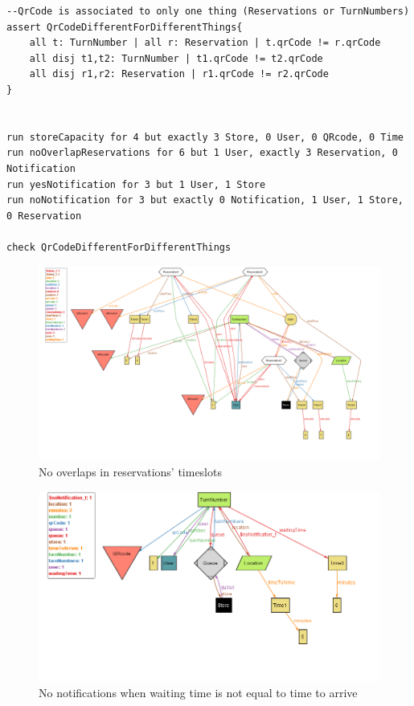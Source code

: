 \documentclass{article}
\begin{document}
\begin{lstlisting}[language=alloy]
--QrCode is associated to only one thing (Reservations or TurnNumbers)
assert QrCodeDifferentForDifferentThings{
	all t: TurnNumber | all r: Reservation | t.qrCode != r.qrCode
    all disj t1,t2: TurnNumber | t1.qrCode != t2.qrCode
    all disj r1,r2: Reservation | r1.qrCode != r2.qrCode
}


run storeCapacity for 4 but exactly 3 Store, 0 User, 0 QRcode, 0 Time
run noOverlapReservations for 6 but 1 User, exactly 3 Reservation, 0 Notification
run yesNotification for 3 but 1 User, 1 Store
run noNotification for 3 but exactly 0 Notification, 1 User, 1 Store, 0 Reservation

check QrCodeDifferentForDifferentThings

\end{lstlisting}

\begin{figure}[H]
  \includegraphics[width=\linewidth]{NoOverlapReservations}
  \caption{No overlaps in reservations' timeslots}
  
\end{figure}

\begin{figure}[H]
  \includegraphics[width=\linewidth]{NoNotification}
  \caption{No notifications when waiting time is not equal to time to arrive}
  
\end{figure}
\end{document}
